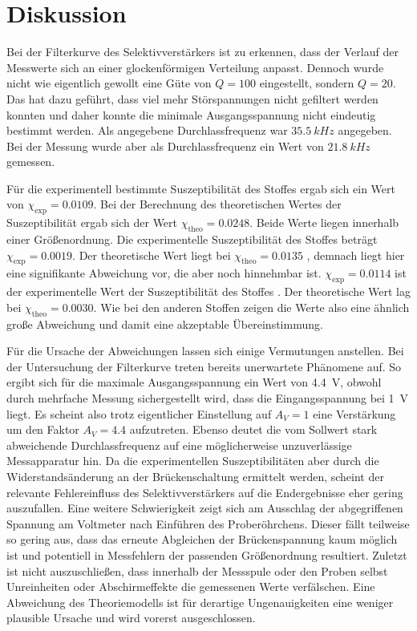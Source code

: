 \section{Diskussion}
\label{sec:diskussion}

Bei der Filterkurve des Selektivverstärkers ist zu erkennen, dass der Verlauf der Messwerte sich an einer glockenförmigen Verteilung
anpasst. Dennoch wurde nicht wie eigentlich gewollt eine Güte von $Q = 100$ eingestellt, sondern $Q = 20$. 
Das hat dazu geführt, dass viel mehr Störspannungen nicht gefiltert werden konnten und daher konnte die minimale Ausgangsspannung
nicht eindeutig bestimmt werden. Als angegebene Durchlassfrequenz war $\SI{35.5}{kHz}$ angegeben. Bei der Messung wurde aber
als Durchlassfrequenz ein Wert von $\SI{21.8}{kHz}$ gemessen.

Für die experimentell bestimmte Suszeptibilität des Stoffes  ergab sich ein Wert von $\chi_\text{exp} = 0.0109$. 
Bei der Berechnung des theoretischen Wertes der Suszeptibilität ergab sich der Wert $\chi_\text{theo} = 0.0248$. Beide Werte
liegen innerhalb einer Größenordnung.
Die experimentelle Suszeptibilität des Stoffes  beträgt $\chi_\text{exp} = 0.0019$. Der theoretische Wert liegt bei
$\chi_\text{theo} = 0.0135$ , demnach liegt hier eine signifikante Abweichung vor, die aber noch hinnehmbar ist.
$\chi_\text{exp} = 0.0114$ ist der experimentelle Wert der Suszeptibilität des Stoffes . Der theoretische Wert lag bei
$\chi_\text{theo} = 0.0030$. Wie bei den anderen Stoffen zeigen die Werte also eine ähnlich große Abweichung und damit eine
akzeptable Übereinstimmung.

Für die Ursache der Abweichungen lassen sich einige Vermutungen anstellen. Bei der Untersuchung der Filterkurve treten bereits
unerwartete Phänomene auf. So ergibt sich für die maximale Ausgangsspannung ein Wert von \qty{4.4}{\volt}, obwohl durch mehrfache
Messung sichergestellt wird, dass die Eingangsspannung bei \qty{1}{\volt} liegt. Es scheint also trotz eigentlicher Einstellung auf
$A_V = 1$ eine Verstärkung um den Faktor $A_V = \num{4.4}$ aufzutreten. Ebenso deutet die vom Sollwert stark abweichende
Durchlassfrequenz auf eine möglicherweise unzuverlässige Messapparatur hin. Da die experimentellen Suszeptibilitäten aber
durch die Widerstandsänderung an der Brückenschaltung ermittelt werden, scheint der relevante Fehlereinfluss des Selektivverstärkers
auf die Endergebnisse eher gering auszufallen. Eine weitere Schwierigkeit zeigt sich am Ausschlag der
abgegriffenen Spannung am Voltmeter nach Einführen des Proberöhrchens. Dieser fällt teilweise so gering aus, dass das erneute Abgleichen
der Brückenspannung kaum möglich ist und potentiell in Messfehlern der passenden Größenordnung resultiert. Zuletzt ist nicht
auszuschließen, dass innerhalb der Messspule oder den Proben selbst Unreinheiten oder Abschirmeffekte die gemessenen Werte verfälschen.
Eine Abweichung des Theoriemodells ist für derartige Ungenauigkeiten eine weniger plausible Ursache und wird vorerst ausgeschlossen.

